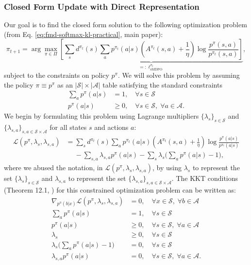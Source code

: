 \documentclass[a4paper, 10pt]{article}
\begin{document}
\subsubsection{Closed Form Update with Direct Representation}
Our goal is to find the closed form solution to the following optimization problem (from Eq. \ref{eq:fmd-softmax-kl-practical}, main paper):
\begin{equation}
  \pi_{t+1} = \arg\max_{\pi \in \Pi} \underbrace{\left[ \sum_s d^{\pi_t}(s) \sum_a p^{\pi_t}(a | s) \left(A^{\pi_t}(s, a) + \frac{1}{\eta} \right) \log \frac{p^\pi(s, a)}{p^{\pi_t}(s, a)} \right]}_{=: \ell^{\pi_t}_{\text{sMDPO}}}, \label{eq: optim_problem_sppo}
\end{equation}
subject to the constraints on policy $p^\pi$. We will solve this problem by assuming the policy $\pi \equiv p^\pi$ as an $|\mathcal{S}| \times |\mathcal{A}|$ table satisfying the standard constraints
\begin{align*}
  \sum_a p^\pi(a | s) &= 1,  \quad \forall s \in \mathcal{S} \\
  p^\pi(a | s) &\geq 0,  \quad \forall s \in \mathcal{S}, \; \forall a \in \mathcal{A}.
\end{align*}
We begin by formulating this problem using Lagrange multipliers $\{\lambda_s\}_{s \in \mathcal{S}}$ and $\{\lambda_{s, a}\}_{s, a \in \mathcal{S} \times \mathcal{A}}$ for all states $s$ and actions $a$:
\begin{align}
  \mathcal{L}(p^\pi, \lambda_s, \lambda_{s, a}) &= \sum_s d^{\pi_t}(s) \sum_a p^{\pi_t}(a | s) \left(A^{\pi_t}(s, a) + \frac{1}{\eta} \right) \log \frac{p^\pi(a | s)}{p^{\pi_t}(a | s)} \nonumber \\
  & \quad \; - \sum_{s, a} \lambda_{s, a} p^\pi(a | s) - \sum_s \lambda_{s} \bigg( \sum_a p^\pi(a | s) - 1 \bigg),
\end{align}
where we abused the notation, in $\mathcal{L}(p^\pi, \lambda_s, \lambda_{s, a})$, by using $\lambda_s$ to represent the set $\{\lambda_s\}_{s \in \mathcal{S}}$ and $\lambda_{s, a}$ to represent the set $\{\lambda_{s, a}\}_{s, a \in \mathcal{S} \times \mathcal{A}}$. The KKT conditions (Theorem 12.1, \citet{nocedal2006numerical}) for this constrained optimization problem can be written as:
\begin{align}
  \nabla_{p^\pi(b|x)} \mathcal{L}(p^\pi, \lambda_s, \lambda_{s, a}) &= 0, \quad \forall x \in \mathcal{S}, \; \forall b \in \mathcal{A} \tag{C1} \label{eq: KKT1} \\
  \sum_a p^\pi(a | s) &= 1, \quad \forall s \in \mathcal{S} \tag{C2} \label{eq: KKT2} \\
  p^\pi(a | s) &\geq 0, \quad \forall s \in \mathcal{S}, \; \forall a \in \mathcal{A} \tag{C3} \label{eq: KKT3} \\
  \lambda_s &\geq 0, \quad \forall s \in \mathcal{S} \tag{C4} \label{eq: KKT4} \\
  \lambda_{s} \bigg( \sum_a p^\pi(a | s) - 1 \bigg) &= 0, \quad \forall s \in \mathcal{S} \tag{C5} \label{eq: KKT5} \\
  \lambda_{s, a} p^\pi(a | s) &= 0, \quad \forall s \in \mathcal{S}, \; \forall a \in \mathcal{A}. \tag{C6} \label{eq: KKT6}
\end{align}
\end{document}
